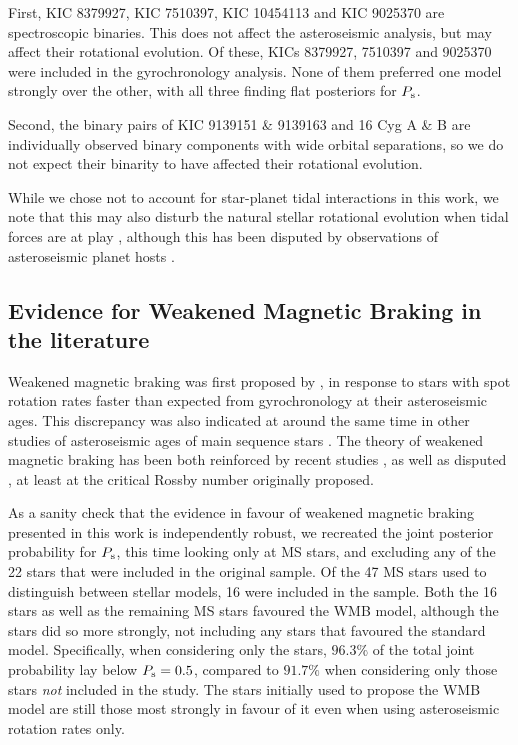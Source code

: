 \documentclass[12pt]{article}
\begin{document}
First, KIC 8379927, KIC 7510397, KIC 10454113 and KIC 9025370 are spectroscopic binaries. This does not affect the asteroseismic analysis, but may affect their rotational evolution. Of these, KICs 8379927, 7510397 and 9025370 were included in the gyrochronology analysis. None of them preferred one model strongly over the other, with all three finding flat posteriors for $P_{\rm s}$.

Second, the binary pairs of KIC 9139151 \& 9139163 and 16 Cyg A \& B are individually observed binary components with wide orbital separations, so we do not expect their binarity to have affected their rotational evolution. 

While we chose not to account for star-planet tidal interactions in this work, we note that this may also disturb the natural stellar rotational evolution when tidal forces are at play \cite{maxted+2015,gallet+delorme2019, benbakoura+2019}, although this has been disputed by observations of asteroseismic planet hosts \cite{ceillier+2016}.\\

\subsection{Evidence for Weakened Magnetic Braking in the literature}
Weakened magnetic braking was first proposed by \cite{vansaders+2016}, in response to stars with spot rotation rates faster than expected from gyrochronology at their asteroseismic ages. This discrepancy was also indicated at around the same time in other studies of asteroseismic ages of main sequence stars \cite{nielsen+2015, angus+2015, davies+2015}. The theory of weakened magnetic braking has been both reinforced by recent studies \cite{metcalfe+egeland2019}, as well as disputed \cite{lorenzo-oliveira+2019}, at least at the critical Rossby number originally proposed.

As a sanity check that the evidence in favour of weakened magnetic braking presented in this work is independently robust, we recreated the joint posterior probability for $P_{\rm s}$, this time looking only at MS stars, and excluding any of the 22 stars that were included in the original \cite{vansaders+2016} sample. Of the 47 MS stars used to distinguish between stellar models, 16 were included in the \cite{vansaders+2016} sample. Both the 16 \cite{vansaders+2016} stars as well as the remaining MS stars favoured the WMB model, although the \cite{vansaders+2016} stars did so more strongly, not including any stars that favoured the standard model. Specifically, when considering only the \cite{vansaders+2016} stars, $96.3\%$ of the total joint probability lay below $P_{\rm s} = 0.5$, compared to $91.7\%$ when considering only those stars \emph{not} included in the \cite{vansaders+2016} study. The stars initially used to propose the WMB model are still those most strongly in favour of it even when using asteroseismic rotation rates only. 
\end{document}
